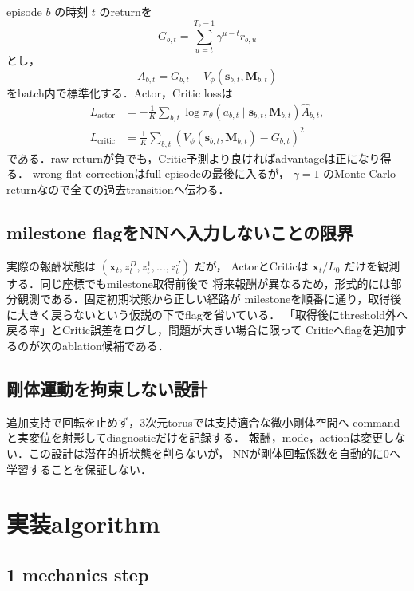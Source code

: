 \documentclass[a4paper,11pt]{ltjsarticle}
\begin{document}
episode $b$ の時刻 $t$ のreturnを
\begin{equation}
 G_{b,t}=\sum_{u=t}^{T_b-1}\gamma^{u-t}r_{b,u}
\end{equation}
とし，
\begin{equation}
 A_{b,t}=G_{b,t}-V_\phi(\bm s_{b,t},\bm M_{b,t})
\end{equation}
をbatch内で標準化する．Actor，Critic lossは
\begin{align}
 L_{\mathrm{actor}}
 &=-\frac1K\sum_{b,t}
  \log\pi_\theta(a_{b,t}\mid\bm s_{b,t},\bm M_{b,t})
  \widehat A_{b,t},\\
 L_{\mathrm{critic}}
 &=\frac1K\sum_{b,t}
 \left(V_\phi(\bm s_{b,t},\bm M_{b,t})-G_{b,t}\right)^2
\end{align}
である．raw returnが負でも，Critic予測より良ければadvantageは正になり得る．
wrong-flat correctionはfull episodeの最後に入るが，
$\gamma=1$ のMonte Carlo returnなので全ての過去transitionへ伝わる．

\subsection{milestone flagをNNへ入力しないことの限界}

実際の報酬状態は $(\bm x_t,z_t^D,z_t^1,\ldots,z_t^J)$ だが，
ActorとCriticは $\bm x_t/L_0$ だけを観測する．同じ座標でもmilestone取得前後で
将来報酬が異なるため，形式的には部分観測である．固定初期状態から正しい経路が
milestoneを順番に通り，取得後に大きく戻らないという仮説の下でflagを省いている．
「取得後にthreshold外へ戻る率」とCritic誤差をログし，問題が大きい場合に限って
Criticへflagを追加するのが次のablation候補である．

\subsection{剛体運動を拘束しない設計}

追加支持で回転を止めず，3次元torusでは支持適合な微小剛体空間へ
commandと実変位を射影してdiagnosticだけを記録する．
報酬，mode，actionは変更しない．この設計は潜在的折状態を削らないが，
NNが剛体回転係数を自動的に0へ学習することを保証しない．

\section{実装algorithm}
\label{sec:algorithm}

\subsection{1 mechanics step}
\end{document}
